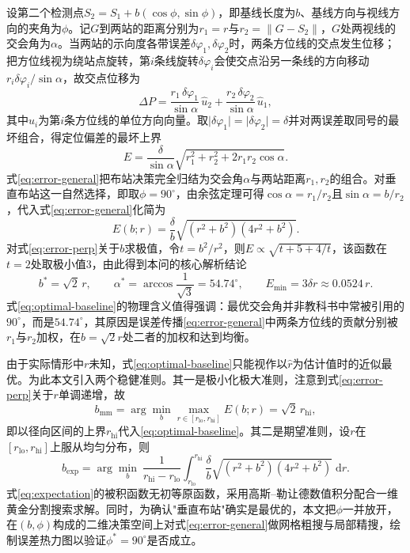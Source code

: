 \documentclass[12pt,a4paper]{ctexart}
\begin{document}
设第二个检测点$S_2=S_1+b(\cos\phi,\sin\phi)$，即基线长度为$b$、基线方向与视线方向的夹角为$\phi$。记$G$到两站的距离分别为$r_1=r$与$r_2=\lVert G-S_2\rVert$，$G$处两视线的交会角为$\alpha$。当两站的示向度各带误差$\delta\varphi_1,\delta\varphi_2$时，两条方位线的交点发生位移；把方位线视为绕站点旋转，第$i$条线旋转$\delta\varphi_i$会使交点沿另一条线的方向移动$r_i\delta\varphi_i/\sin\alpha$，故交点位移为
\begin{equation}
\Delta P=\frac{r_1\,\delta\varphi_1}{\sin\alpha}\,\hat u_2+\frac{r_2\,\delta\varphi_2}{\sin\alpha}\,\hat u_1,
\label{eq:error-vector}
\end{equation}
其中$\hat u_i$为第$i$条方位线的单位方向向量。取$\lvert\delta\varphi_1\rvert=\lvert\delta\varphi_2\rvert=\delta$并对两误差取同号的最坏组合，得定位偏差的最坏上界
\begin{equation}
E=\frac{\delta}{\sin\alpha}\sqrt{r_1^2+r_2^2+2r_1r_2\cos\alpha}.
\label{eq:error-general}
\end{equation}
式\eqref{eq:error-general}把布站决策完全归结为交会角$\alpha$与两站距离$r_1,r_2$的组合。对垂直布站这一自然选择，即取$\phi=90^\circ$，由余弦定理可得$\cos\alpha=r_1/r_2$且$\sin\alpha=b/r_2$，代入式\eqref{eq:error-general}化简为
\begin{equation}
E(b;r)=\frac{\delta}{b}\sqrt{(r^2+b^2)(4r^2+b^2)} .
\label{eq:error-perp}
\end{equation}
对式\eqref{eq:error-perp}关于$b$求极值，令$t=b^2/r^2$，则$E\propto\sqrt{t+5+4/t}$，该函数在$t=2$处取极小值$3$，由此得到本问的核心解析结论
\begin{equation}
b^{\ast}=\sqrt2\,r,\qquad \alpha^{\ast}=\arccos\frac{1}{\sqrt3}=54.74^\circ,\qquad E_{\min}=3\delta r\approx0.0524\,r .
\label{eq:optimal-baseline}
\end{equation}
式\eqref{eq:optimal-baseline}的物理含义值得强调：最优交会角并非教科书中常被引用的$90^\circ$，而是$54.74^\circ$，其原因是误差传播\eqref{eq:error-general}中两条方位线的贡献分别被$r_1$与$r_2$加权，在$b=\sqrt2 r$处二者的加权和达到均衡。

由于实际情形中$r$未知，式\eqref{eq:optimal-baseline}只能视作以$\hat r$为估计值时的近似最优。为此本文引入两个稳健准则。其一是极小化极大准则，注意到式\eqref{eq:error-perp}关于$r$单调递增，故
\begin{equation}
b_{\mathrm{mm}}=\arg\min_{b}\max_{r\in[r_{\mathrm{lo}},r_{\mathrm{hi}}]}E(b;r)=\sqrt2\,r_{\mathrm{hi}},
\label{eq:minimax}
\end{equation}
即以径向区间的上界$r_{\mathrm{hi}}$代入\eqref{eq:optimal-baseline}。其二是期望准则，设$r$在$[r_{\mathrm{lo}},r_{\mathrm{hi}}]$上服从均匀分布，则
\begin{equation}
b_{\mathrm{exp}}=\arg\min_{b}\ \frac{1}{r_{\mathrm{hi}}-r_{\mathrm{lo}}}\int_{r_{\mathrm{lo}}}^{r_{\mathrm{hi}}}\frac{\delta}{b}\sqrt{(r^2+b^2)(4r^2+b^2)}\;\mathrm{d}r .
\label{eq:expectation}
\end{equation}
式\eqref{eq:expectation}的被积函数无初等原函数，采用高斯--勒让德数值积分配合一维黄金分割搜索求解。同时，为确认"垂直布站"确实是最优的，本文把$\phi$一并放开，在$(b,\phi)$构成的二维决策空间上对式\eqref{eq:error-general}做网格粗搜与局部精搜，绘制误差热力图以验证$\phi^{\ast}=90^\circ$是否成立。
\end{document}
